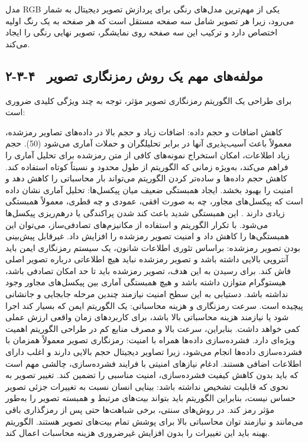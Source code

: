 مدل ‎RGB‎ یکی از مهم‌ترین مدل‌های رنگی برای پردازش تصویر دیجیتال به شمار می‌رود، زیرا هر تصویر شامل سه صفحه مستقل است که هر صفحه به یک رنگ اولیه اختصاص دارد و ترکیب این سه صفحه روی نمایشگر، تصویر نهایی رنگی را ایجاد می‌کند.

\subsection{۲-۳-۴  مولفه‌های مهم یک روش رمزنگاری تصویر}

برای طراحی یک الگوریتم رمزنگاری تصویر مؤثر، توجه به چند ویژگی کلیدی ضروری است\cite{ref44}:

کاهش اضافات و حجم داده: اضافات زیاد و حجم بالا در داده‌های تصاویر رمزشده، معمولاً باعث آسیب‌پذیری آنها در برابر تحلیلگران و حملات آماری می‌شود (50). حجم زیاد اطلاعات، امکان استخراج نمونه‌های کافی از متن رمزشده برای تحلیل آماری را فراهم می‌کند، به‌ویژه زمانی که الگوریتم از طول محدود و نسبتاً کوتاه استفاده کند. کاهش حجم داده‌ها و ساده‌تر کردن الگوریتم می‌تواند بار محاسباتی را کاهش دهد و امنیت را بهبود بخشد.  ایجاد همبستگی ضعیف میان پیکسل‌ها: تحلیل آماری نشان داده است که پیکسل‌های مجاور، چه به صورت افقی، عمودی و چه قطری، معمولاً همبستگی زیادی دارند . این همبستگی شدید باعث کند شدن پراکندگی یا درهم‌ریزی پیکسل‌ها می‌شود. با تکرار الگوریتم و استفاده از مکانیزم‌های تصادفی‌ساز، می‌توان این همبستگی‌ها را کاهش داد و امنیت تصویر رمزشده را افزایش داد. غیرقابل پیش‌بینی بودن تصویر رمزشده: براساس تئوری اطلاعات شانون، یک سیستم رمزنگاری ایمن باید آنتروپی بالایی داشته باشد و تصویر رمزشده نباید هیچ اطلاعاتی درباره تصویر اصلی فاش کند. برای رسیدن به این هدف، تصویر رمزشده باید تا حد امکان تصادفی باشد، هیستوگرام متوازن داشته باشد و هیچ همبستگی آماری بین پیکسل‌های مجاور وجود نداشته باشد. دستیابی به این سطح امنیت نیازمند چندین مرحله جابجایی و جانشانی پیچیده است.  سرعت رمزنگاری و هزینه محاسباتی: یک الگوریتم ایمن که بسیار کند اجرا شود یا نیازمند هزینه محاسباتی بالا باشد، برای کاربردهای زمان واقعی ارزش عملی کمی خواهد داشت. بنابراین، سرعت بالا و مصرف منابع کم در طراحی الگوریتم اهمیت ویژه‌ای دارد.  فشرده‌سازی داده‌ها همراه با امنیت: رمزنگاری تصویر معمولاً همزمان با فشرده‌سازی داده‌ها انجام می‌شود، زیرا تصاویر دیجیتال حجم بالایی دارند و اغلب دارای اطلاعات اضافی هستند. ادغام نیازهای امنیتی با فرایند فشرده‌سازی، چالشی مهم است که باید بدون کاهش کیفیت فشرده‌سازی، امنیت مناسبی را تضمین کند.  تغییر تصویر به نحوی که قابلیت تشخیص نداشته باشد: بینایی انسان نسبت به تغییرات جزئی تصویر حساس نیست، بنابراین الگوریتم باید بتواند بیت‌های مرتبط و همبسته تصویر را به‌طور مؤثر رمز کند. در روش‌های سنتی، برخی شباهت‌ها حتی پس از رمزگذاری باقی می‌مانند و نیازمند توان محاسباتی بالا برای پوشش تمام بیت‌های تصویر هستند. الگوریتم بهینه باید این تغییرات را بدون افزایش غیرضروری هزینه محاسبات اعمال کند\cite{ref45}.

